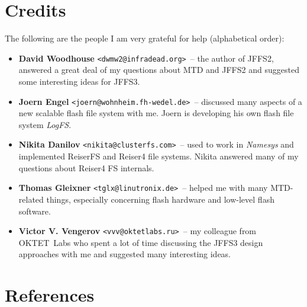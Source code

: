 \documentclass[12pt,a4paper,oneside,titlepage]{article}
\begin{document}
%
%
\section{Credits}
The following are the people I am very grateful for help (alphabetical order):

\begin{itemize}
\item \textbf{David Woodhouse} \texttt{<dwmw2@infradead.org>}~-- the author of
JFFS2, answered a great deal of my questions about MTD and JFFS2 and suggested
some interesting ideas for JFFS3.

\item \textbf{Joern Engel} \texttt{<joern@wohnheim.fh-wedel.de>}~-- discussed
many aspects of a new scalable flash file system with me. Joern is developing
his own flash file system \emph{LogFS}.

\item \textbf{Nikita Danilov} \texttt{<nikita@clusterfs.com>}~-- used to work
in \emph{Namesys} and implemented ReiserFS and Reiser4 file systems.
Nikita answered many of my questions about Reiser4 FS internals.

\item \textbf{Thomas Gleixner} \texttt{<tglx@linutronix.de>}~-- helped me with
many MTD-related things, especially concerning flash hardware and low-level
flash software.

\item \textbf{Victor V. Vengerov} \texttt{<vvv@oktetlabs.ru>}~-- my colleague
from OKTET~Labs who spent a lot of time discussing the JFFS3 design approaches
with me and suggested many interesting ideas.

\end{itemize}

%
%
\section{References}
\end{document}
